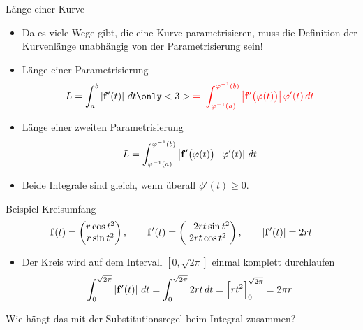 \begin{frame}{Länge einer Kurve}
    \pause
    \begin{itemize}
        \item Da es viele Wege gibt, die eine Kurve parametrisieren, muss die Definition der Kurvenlänge unabhängig von der Parametrisierung sein!
        \item Länge einer Parametrisierung 
        \begin{gather*}
            L = \int_a^b \left|\vf'(t)\right|\,dt
            \only<3>{{\color{red}=\;
            \int_{\phi^{-1}(a)}^{\phi^{-1}(b)} \left|\vf'\bigl(\phi(t)\bigr)\right|
            \phi'(t)\,dt
            }}
        \end{gather*}
        \item Länge einer zweiten Parametrisierung
        \begin{gather*}
            L = \int_{\varphi^{-1}(a)}^{\varphi^{-1}(b)} \left|\mathbf{f}'\bigl(\varphi(t)\bigr)\right|
            \left|\varphi'(t)\right|\,dt
        \end{gather*}
        
        \item Beide Integrale sind gleich, wenn überall $\phi'(t) \ge 0$.
    \end{itemize}
\end{frame}

\begin{frame}{Beispiel Kreisumfang}
            \begin{gather*}
        \mathbf{f}(t) = \begin{pmatrix}
            r \cos t^2\\r \sin t^2
        \end{pmatrix},
        \qquad
        \mathbf{f}'(t) = \begin{pmatrix}
            -2rt \sin t^2 \\ 2rt \cos t^2
        \end{pmatrix},
        \qquad
        \left|\mathbf{f}'(t)\right| = 2rt
    \end{gather*}

    \begin{itemize}
    \item Der Kreis wird auf dem Intervall $[0,\sqrt{2\pi}]$ einmal komplett durchlaufen
        \begin{gather*}
            \int_0^{\sqrt{2\pi}} \left|\mathbf{f}'(t)\right| \,dt = \int_0^{\sqrt{2\pi}} 2rt\,dt = \Bigl[rt^2\Bigr]_0^{\sqrt{2\pi}} = 2\pi r
        \end{gather*}
    \end{itemize}
    \pause
    \begin{Denkpause}
        Wie hängt das mit der Substitutionsregel beim Integral zusammen?
    \end{Denkpause}
 \end{frame}


